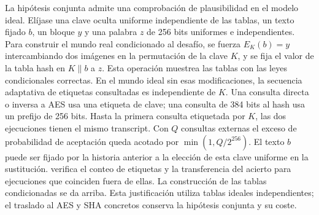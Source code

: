 La hipótesis conjunta admite una comprobación de plausibilidad en el
modelo ideal. Elíjase una clave oculta uniforme independiente de las tablas,
un texto fijado \(b\), un bloque \(y\) y una palabra \(z\) de 256 bits
uniformes e independientes. Para construir el mundo real condicionado al
desafío, se fuerza \(E_K(b)=y\) intercambiando dos imágenes en la permutación
de la clave \(K\), y se fija el valor de la tabla hash en \(K\|b\) a \(z\).
Esta operación muestrea las tablas con las leyes condicionales correctas.
En el mundo ideal sin esas modificaciones, la secuencia adaptativa de etiquetas
consultadas es independiente de \(K\). Una consulta directa o inversa a
AES usa una etiqueta de clave; una consulta de 384 bits al hash usa un
prefijo de 256 bits. Hasta la primera consulta etiquetada por \(K\), las
dos ejecuciones tienen el mismo transcript. Con \(Q\) consultas externas
el exceso de probabilidad de aceptación queda acotado por
\(\min(1,Q/2^{256})\). El texto \(b\) puede ser fijado por la historia
anterior a la elección de esta clave uniforme en la sustitución.
 verifica el conteo
de etiquetas y la transferencia del acierto para ejecuciones que coinciden
fuera de ellas. La construcción de las tablas condicionadas se da arriba.
Esta justificación utiliza tablas ideales independientes; el traslado al
AES y SHA concretos conserva la hipótesis conjunta y su coste.

